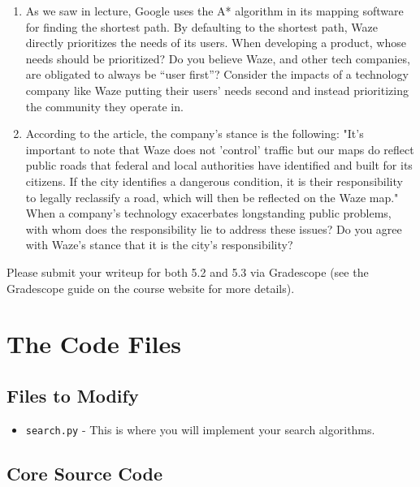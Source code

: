 \documentclass{article}
\begin{document}
\begin{enumerate}

\item As we saw in lecture, Google uses the A* algorithm in its mapping software for finding the shortest path. By defaulting to the shortest path, Waze directly prioritizes the needs of its users. When developing a product, whose needs should be prioritized? Do you believe Waze, and other tech companies, are obligated to always be “user first”? Consider the impacts of a technology company like Waze putting their users' needs second and instead prioritizing the community they operate in.

\item According to the article, the company's stance is the following:
"It's important to note that Waze does not 'control' traffic but our maps do reflect public roads that federal and local authorities have identified and built for its citizens. If the city identifies a dangerous condition, it is their responsibility to legally reclassify a road, which will then be reflected on the Waze map." When a company's technology exacerbates longstanding public problems, with whom does the responsibility lie to address these issues? Do you agree with Waze's stance that it is the city’s responsibility?
\end{enumerate}


\noindent
Please submit your writeup for both 5.2 and 5.3 via Gradescope (see the Gradescope guide on the course website for more details).


\section{The Code Files}

\subsection{Files to Modify}

\begin{itemize}

\item \verb|search.py| - This is where you will implement your search algorithms.

\end{itemize}


\subsection{Core Source Code}
\end{document}
